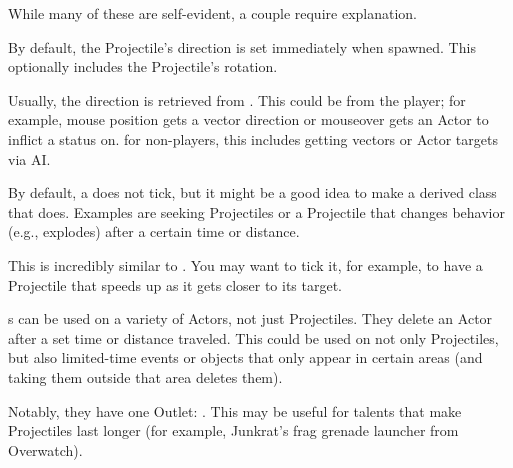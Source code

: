 While many of these are self-evident, a couple require explanation.



By default, the Projectile's direction is set immediately when spawned. This optionally includes the Projectile's rotation.

Usually, the direction is retrieved from . This could be from the player; for example, mouse position gets a vector direction or mouseover gets an Actor to inflict a status on.  for non-players, this includes getting vectors or Actor targets via AI. 

By default, a  does not tick, but it might be a good idea to make a derived class that does. Examples are seeking Projectiles or a Projectile that changes behavior (e.g., explodes) after a certain time or distance.



This is incredibly similar to . You may want to tick it, for example, to have a Projectile that speeds up as it gets closer to its target.



s can be used on a variety of Actors, not just Projectiles. They delete an Actor after a set time or distance traveled. This could be used on not only Projectiles, but also limited-time events or objects that only appear in certain areas (and taking them outside that area deletes them).


Notably, they have one Outlet: . This may be useful for talents that make Projectiles last longer (for example, Junkrat's frag grenade launcher from Overwatch).


\postamble{}